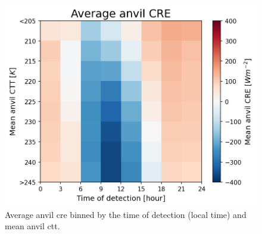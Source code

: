 \begin{figure}[t]
    \includegraphics[width=\textwidth]{figures/ch3_13.png}
    \caption[
    Average anvil \acrshort{cre} binned by the time of detection (local time) and mean anvil \acrshort{ctt}
    ]{
    Average anvil \acrshort{cre} binned by the time of detection (local time) and mean anvil \acrshort{ctt}.
    }
    \label{fig:anvil_cre_time_vs_ctt}
\end{figure}
